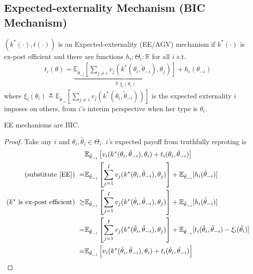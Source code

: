 \documentclass[11pt]{elegantbook_2}
\begin{document}
\subsection{Expected-externality Mechanism (BIC Mechanism)}
\begin{definition}[EE Mechanism]
    $(k^*(\cdot),t(\cdot))$ is an Expected-externality (EE/AGV) mechanism if $k^*(\cdot)$ is ex-post efficient and there are functions $h_i:\Theta_i: \mathbb{R}$ for all $i$ s.t.
    \begin{equation}
        \begin{aligned}
            t_i(\theta)=\underbrace{\mathbb{E}_{\tilde{\theta}_{-i}}\left[\sum_{j\neq i}v_j(k^*(\theta_i,\tilde{\theta}_{-i}),\theta_j)\right]}_{\triangleq \xi_i(\theta_i)}+h_i(\theta_{-i})
        \end{aligned}
        \label{EE}
    \end{equation}
    where $\xi_i(\theta_i)\triangleq\mathbb{E}_{\tilde{\theta}_{-i}}\left[\sum_{j\neq i}v_j(k^*(\theta_i,\tilde{\theta}_{-i}))\right]$ is the expected externality $i$ imposes on others, from $i$'s interim perspective when her type is $\theta_i$.
\end{definition}

\begin{proposition}
    EE mechanisms are BIC.
\end{proposition}
\begin{proof}
    Take any $i$ and $\theta_i,\hat{\theta}_i\in\Theta_i$. $i$'s expected payoff from truthfully reproting is
    \begin{equation}
        \begin{aligned}
            &\mathbb{E}_{\tilde{\theta}_{-i}}\left[v_i(k^*(\theta_i,\tilde{\theta}_{-i}),\theta_i)+t_i(\theta_i,\tilde{\theta}_{-i})\right]\\
            \textnormal{(substitute \eqref{EE}) }=&\mathbb{E}_{\tilde{\theta}_{-i}}\left[\sum_{j=1}^I v_j(k^*(\theta_i,\tilde{\theta}_{-i}),\theta_j)\right]+\mathbb{E}_{\tilde{\theta}_{-i}}[h_i(\tilde{\theta}_{-i})]\\
           \textnormal{($k^*$ is ex-post efficient) } \geq& \mathbb{E}_{\tilde{\theta}_{-i}}\left[\sum_{j=1}^I v_j(k^*(\hat{\theta}_i,\tilde{\theta}_{-i}),\theta_j)\right]+\mathbb{E}_{\tilde{\theta}_{-i}}[h_i(\tilde{\theta}_{-i})]\\
           =& \mathbb{E}_{\tilde{\theta}_{-i}}\left[\sum_{j=1}^I v_j(k^*(\hat{\theta}_i,\tilde{\theta}_{-i}),\theta_j)\right]+\mathbb{E}_{\tilde{\theta}_{-i}}[t_i(\hat{\theta}_i,\tilde{\theta}_{-i})-\xi_i(\hat{\theta_i})]\\
           =&\mathbb{E}_{\tilde{\theta}_{-i}}\left[v_i(k^*(\hat{\theta}_i,\tilde{\theta}_{-i}),\theta_i)+t_i(\hat{\theta}_i,\tilde{\theta}_{-i})\right]
        \end{aligned}
        \nonumber
    \end{equation}
\end{proof}
\end{document}
